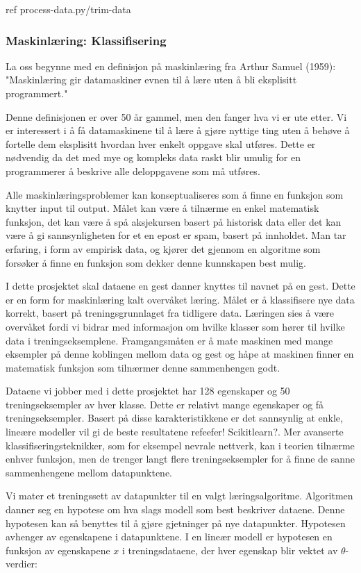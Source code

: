 {\color{red} ref process-data.py/trim-data}

\subsubsection*{Maskinlæring: Klassifisering}
La oss begynne med en definisjon på maskinlæring fra Arthur Samuel (1959): "Maskinlæring gir datamaskiner evnen til å lære uten å bli eksplisitt programmert."

Denne definisjonen er over 50 år gammel, men den fanger hva vi er ute etter. Vi er interessert i å få datamaskinene til å lære å gjøre nyttige ting uten å behøve å fortelle dem eksplisitt hvordan hver enkelt oppgave skal utføres. Dette er nødvendig da det med mye og kompleks data raskt blir umulig for en programmerer å beskrive alle deloppgavene som må utføres.

Alle maskinlæringsproblemer kan konseptualiseres som å finne en funksjon som knytter input til output. Målet kan være å tilnærme en enkel matematisk funksjon, det kan være å spå aksjekursen basert på historisk data eller det kan være å gi sannsynligheten for et en epost er spam, basert på innholdet. Man tar erfaring, i form av empirisk data, og kjører det gjennom en algoritme som forsøker å finne en funksjon som dekker denne kunnskapen best mulig.

I dette prosjektet skal dataene en gest danner knyttes til navnet på en gest. Dette er en form for maskinlæring kalt overvåket læring. Målet er å klassifisere nye data korrekt, basert på treningsgrunnlaget fra tidligere data. Læringen sies å være overvåket fordi vi bidrar med informasjon om hvilke klasser som hører til hvilke data i treningseksemplene. Framgangsmåten er å mate maskinen med mange eksempler på denne koblingen mellom data og gest og håpe at maskinen finner en matematisk funksjon som tilnærmer denne sammenhengen godt.

Dataene vi jobber med i dette prosjektet har 128 egenskaper og 50 treningseksempler av hver klasse. Dette er relativt mange egenskaper og få treningseksempler. Basert på disse karakteristikkene er det sannsynlig at enkle, lineære modeller vil gi de beste resultatene {\color{red} refeefer! Scikitlearn?}. Mer avanserte klassifiseringsteknikker, som for eksempel nevrale nettverk, kan i teorien tilnærme enhver funksjon, men de trenger langt flere treningseksempler for å finne de sanne sammenhengene mellom datapunktene.

Vi mater et treningssett av datapunkter til en valgt læringsalgoritme. Algoritmen danner seg en hypotese om hva slags modell som best beskriver dataene. Denne hypotesen kan så benyttes til å gjøre gjetninger på nye datapunkter. Hypotesen avhenger av egenskapene i datapunktene. I en lineær modell er hypotesen en funksjon av egenskapene $x$ i treningsdataene, der hver egenskap blir vektet av $\theta$-verdier:

